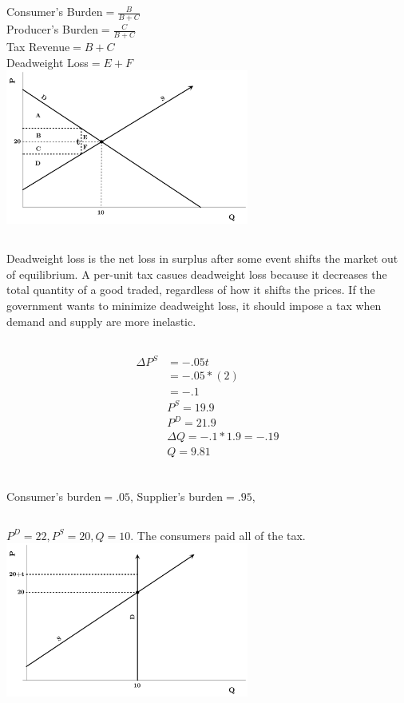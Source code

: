 \documentclass{article}
\begin{document}
	\subsection[b]{} 
Consumer's Burden$=\frac{B}{B+C}$\\
Producer's Burden$=\frac{C}{B+C}$\\
Tax Revenue$=B+C$\\
Deadweight Loss$=E+F$\\
\includegraphics[height=2in]{Charts/7b}

	\subsection[c]{} 
Deadweight loss is the net loss in surplus after some event shifts the market out of equilibrium.  A per-unit tax casues deadweight loss
because it decreases the total quantity of a good traded, regardless of how it shifts the prices. If the government wants to minimize deadweight
loss, it should impose a tax when demand and supply are more inelastic.
	\subsection[d]{} 
\begin{align*}
\Delta P^S&=-.05t\\
&=-.05*(2)\\
&=-.1\\
&P^S=19.9\\
&P^D=21.9\\
&\Delta Q=-.1*1.9=-.19\\ 	
&Q=9.81\\
\end{align*}
	\subsection[e]{} 
Consumer's burden$=.05$, Supplier's burden$=.95$,
	\subsection[f]{} 
$P^D=22, P^S=20, Q=10.$
The consumers paid all of the tax.\\
\includegraphics[height=2in]{Charts/7f}
																	
							
															
				
\end{document}

